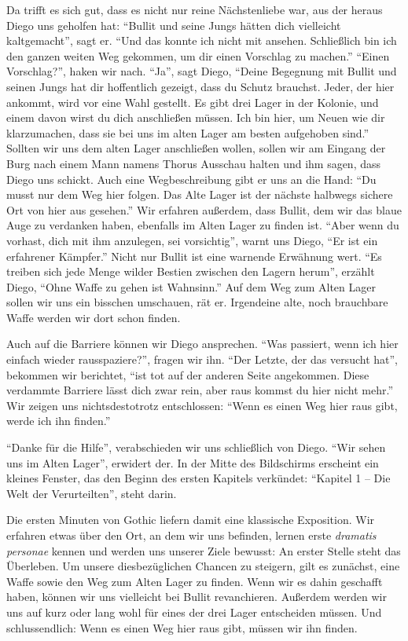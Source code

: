 \documentclass[a5paper,pagesize]{scrbook}
\begin{document}
Da trifft es sich gut, dass es nicht nur reine Nächstenliebe war, aus der heraus Diego uns geholfen hat:
\enquote{Bullit und seine Jungs hätten dich vielleicht kaltgemacht}, sagt er.
\enquote{Und das konnte ich nicht mit ansehen.
Schließlich bin ich den ganzen weiten Weg gekommen, um dir einen Vorschlag zu machen.}
\enquote{Einen Vorschlag?}, haken wir nach.
\enquote{Ja}, sagt Diego, \enquote{Deine Begegnung mit Bullit und seinen Jungs hat dir hoffentlich gezeigt, dass du Schutz brauchst.
Jeder, der hier ankommt, wird vor eine Wahl gestellt.
Es gibt drei Lager in der Kolonie, und einem davon wirst du dich anschließen müssen.
Ich bin hier, um Neuen wie dir klarzumachen, dass sie bei uns im alten Lager am besten aufgehoben sind.}
Sollten wir uns dem alten Lager anschließen wollen, sollen wir am Eingang der Burg nach einem Mann namens Thorus Ausschau halten und ihm sagen, dass Diego uns schickt.
Auch eine Wegbeschreibung gibt er uns an die Hand:
\enquote{Du musst nur dem Weg hier folgen.
Das Alte Lager ist der nächste halbwegs sichere Ort von hier aus gesehen.}
Wir erfahren außerdem, dass Bullit, dem wir das blaue Auge zu verdanken haben, ebenfalls im Alten Lager zu finden ist.
\enquote{Aber wenn du vorhast, dich mit ihm anzulegen, sei vorsichtig}, warnt uns Diego, \enquote{Er ist ein erfahrener Kämpfer.}
Nicht nur Bullit ist eine warnende Erwähnung wert.
\enquote{Es treiben sich jede Menge wilder Bestien zwischen den Lagern herum}, erzählt Diego, \enquote{Ohne Waffe zu gehen ist Wahnsinn.}
Auf dem Weg zum Alten Lager sollen wir uns ein bisschen umschauen, rät er.
Irgendeine alte, noch brauchbare Waffe werden wir dort schon finden.

Auch auf die Barriere können wir Diego ansprechen.
\enquote{Was passiert, wenn ich hier einfach wieder rausspaziere?}, fragen wir ihn.
\enquote{Der Letzte, der das versucht hat}, bekommen wir berichtet, \enquote{ist tot auf der anderen Seite angekommen.
Diese verdammte Barriere lässt dich zwar rein, aber raus kommst du hier nicht mehr.}
Wir zeigen uns nichtsdestotrotz entschlossen:
\enquote{Wenn es einen Weg hier raus gibt, werde ich ihn finden.}

\enquote{Danke für die Hilfe}, verabschieden wir uns schließlich von Diego.
\enquote{Wir sehen uns im Alten Lager}, erwidert der.
In der Mitte des Bildschirms erscheint ein kleines Fenster, das den Beginn des ersten Kapitels verkündet:
\enquote{Kapitel 1 -- Die Welt der Verurteilten}, steht darin.

Die ersten Minuten von Gothic liefern damit eine klassische Exposition.
Wir erfahren etwas über den Ort, an dem wir uns befinden, lernen erste \textit{dramatis personae} kennen und werden uns unserer Ziele bewusst:
An erster Stelle steht das Überleben.
Um unsere diesbezüglichen Chancen zu steigern, gilt es zunächst, eine Waffe sowie den Weg zum Alten Lager zu finden.
Wenn wir es dahin geschafft haben, können wir uns vielleicht bei Bullit revanchieren.
Außerdem werden wir uns auf kurz oder lang wohl für eines der drei Lager entscheiden müssen.
Und schlussendlich:
Wenn es einen Weg hier raus gibt, müssen wir ihn finden.
\end{document}
